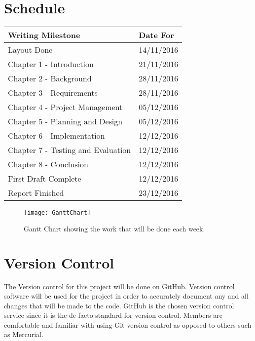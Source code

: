 \section{Schedule}
\begin{tabular}{ |p{6cm}|p{3cm}| }
	\hline
	Writing Milestone & Date For
	\\\hline
	Layout Done & 14/11/2016
	\\\hline
	Chapter 1 - Introduction & 21/11/2016
	\\\hline
	Chapter 2 - Background & 28/11/2016
	\\\hline
	Chapter 3 - Requirements & 28/11/2016
	\\\hline
	Chapter 4 - Project Management & 05/12/2016
	\\\hline
	Chapter 5 - Planning and Design & 05/12/2016
	\\\hline
	Chapter 6 - Implementation & 12/12/2016
	\\\hline
	Chapter 7 - Testing and Evaluation & 12/12/2016
	\\\hline
	Chapter 8 - Conclusion & 12/12/2016
	\\\hline
	First Draft Complete & 12/12/2016
	\\\hline
	Report Finished & 23/12/2016
	\\\hline
\end{tabular}
\begin{figure}[H]
	\texttt{[image: GanttChart]}
	\centering
	\caption{Gantt Chart showing the work that will be done each week.}
	\label{fig:ganttChartPlan}
\end{figure}

\section{Version Control}
The Version control for this project will be done on GitHub. Version control software will be used for the project in order to accurately document any and all changes that will be made to the code. GitHub is the chosen version control service since it is the de facto standard for version control. Members are comfortable and familiar with using Git version control as opposed to others such as Mercurial.

